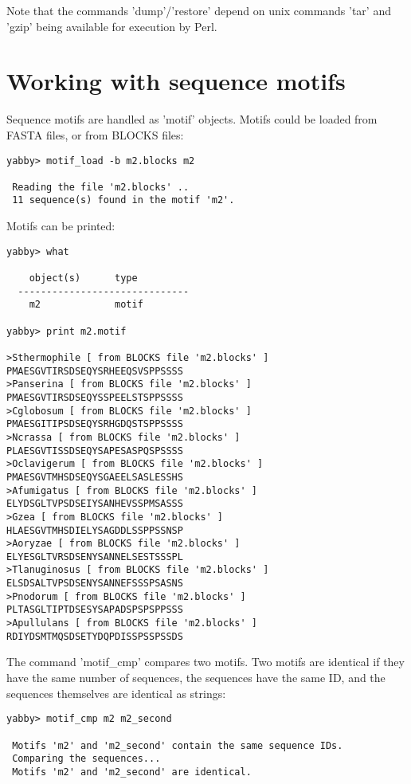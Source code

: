 Note that the commands 'dump'/'restore' depend on unix commands
'tar' and 'gzip' being available for execution by Perl.

\section{Working with sequence motifs}


Sequence motifs are handled as 'motif' objects.  Motifs could
be loaded from FASTA files, or from BLOCKS files:


\begin{verbatim}
yabby> motif_load -b m2.blocks m2

 Reading the file 'm2.blocks' ..
 11 sequence(s) found in the motif 'm2'.
\end{verbatim}

Motifs can be printed:

\begin{verbatim}
yabby> what      

    object(s)      type
  ------------------------------
    m2             motif         

yabby> print m2.motif

>Sthermophile [ from BLOCKS file 'm2.blocks' ]
PMAESGVTIRSDSEQYSRHEEQSVSPPSSSS
>Panserina [ from BLOCKS file 'm2.blocks' ]
PMAESGVTIRSDSEQYSSPEELSTSPPSSSS
>Cglobosum [ from BLOCKS file 'm2.blocks' ]
PMAESGITIPSDSEQYSRHGDQSTSPPSSSS
>Ncrassa [ from BLOCKS file 'm2.blocks' ]
PLAESGVTISSDSEQYSAPESASPQSPSSSS
>Oclavigerum [ from BLOCKS file 'm2.blocks' ]
PMAESGVTMHSDSEQYSGAEELSASLESSHS
>Afumigatus [ from BLOCKS file 'm2.blocks' ]
ELYDSGLTVPSDSEIYSANHEVSSPMSASSS
>Gzea [ from BLOCKS file 'm2.blocks' ]
HLAESGVTMHSDIELYSAGDDLSSPPSSNSP
>Aoryzae [ from BLOCKS file 'm2.blocks' ]
ELYESGLTVRSDSENYSANNELSESTSSSPL
>Tlanuginosus [ from BLOCKS file 'm2.blocks' ]
ELSDSALTVPSDSENYSANNEFSSSPSASNS
>Pnodorum [ from BLOCKS file 'm2.blocks' ]
PLTASGLTIPTDSESYSAPADSPSPSPPSSS
>Apullulans [ from BLOCKS file 'm2.blocks' ]
RDIYDSMTMQSDSETYDQPDISSPSSPSSDS
\end{verbatim}


The command 'motif\_cmp' compares two motifs. Two motifs are
identical if they have the same number of sequences, the sequences
have the same ID, and the sequences themselves are identical
as strings:

\begin{verbatim}
yabby> motif_cmp m2 m2_second

 Motifs 'm2' and 'm2_second' contain the same sequence IDs.
 Comparing the sequences...
 Motifs 'm2' and 'm2_second' are identical.
\end{verbatim}

